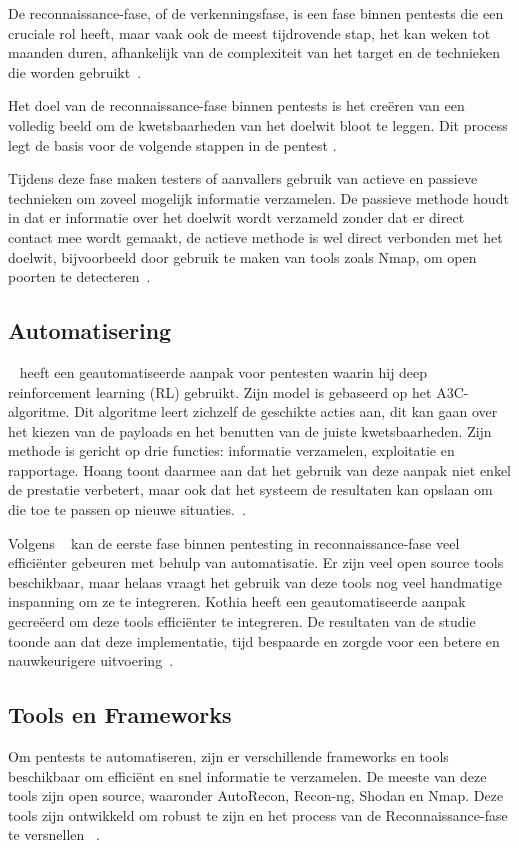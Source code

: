 De reconnaissance-fase, of de verkenningsfase, is een fase binnen pentests die een cruciale rol heeft, maar vaak ook de meest tijdrovende stap, 
het kan weken tot maanden duren, afhankelijk van de complexiteit van het target en de technieken die worden gebruikt~\autocite{Shah}. 

Het doel van de reconnaissance-fase binnen pentests is het creëren van een volledig beeld om de 
kwetsbaarheden van het doelwit bloot te leggen. Dit process legt de basis voor de
volgende stappen in de pentest \autocite{Kothia}.

Tijdens deze fase maken testers of aanvallers gebruik van actieve en passieve technieken om zoveel
mogelijk informatie verzamelen. De passieve methode houdt in dat er informatie over het doelwit wordt verzameld zonder dat er direct contact mee wordt gemaakt, 
de actieve methode is wel direct verbonden met het doelwit, bijvoorbeeld door gebruik te maken van tools zoals Nmap, om open poorten te detecteren~\autocite{Shah}.


\subsection{Automatisering}

~\textcite{Hoang} heeft een geautomatiseerde aanpak voor pentesten waarin hij deep reinforcement 
learning (RL) gebruikt. Zijn model is gebaseerd op het A3C-algoritme. Dit algoritme leert zichzelf de geschikte acties aan, dit kan 
gaan over het kiezen van de payloads en het benutten van de juiste kwetsbaarheden. Zijn methode is gericht op drie functies: informatie verzamelen, 
exploitatie en rapportage. Hoang toont daarmee aan dat het gebruik van deze aanpak niet enkel de prestatie verbetert, maar ook dat het systeem de resultaten 
kan opslaan om die toe te passen op nieuwe situaties.~\autocite{Hoang}.


Volgens ~\textcite{Kothia} kan de eerste fase binnen pentesting in reconnaissance-fase veel 
efficiënter gebeuren met behulp van automatisatie. Er zijn veel open source tools beschikbaar, maar helaas vraagt het gebruik van deze 
tools nog veel handmatige inspanning om ze te integreren. Kothia heeft een geautomatiseerde aanpak gecreëerd om deze tools
efficiënter te integreren. De resultaten van de studie toonde aan dat deze implementatie, tijd 
bespaarde en zorgde voor een betere en nauwkeurigere uitvoering~\autocite{Kothia}.


\subsection{Tools en Frameworks}
 Om pentests te automatiseren, zijn er verschillende frameworks en tools beschikbaar om 
efficiënt en snel informatie te verzamelen. De meeste van deze tools zijn open source, waaronder 
AutoRecon, Recon-ng, Shodan en Nmap. Deze tools zijn ontwikkeld om robust te zijn en het process van de Reconnaissance-fase te versnellen ~\autocite{Shebli}.


